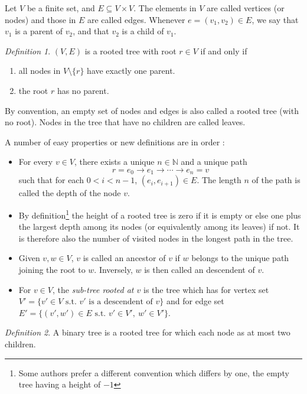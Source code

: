 \documentclass[12pt]{article}
\theoremstyle{plain}
\theoremstyle{remark}
\newtheorem*{definition}{Definition}
\newcommand{\N}{\mathbb{N}}
\begin{document}
Let $V$ be a finite set, and $E \subseteq V \times V.$ The elements in $V$
are called vertices (or nodes) and those in $E$ are called edges. Whenever $e =
(v_1,v_2) \in E$, we say that $v_1$ is a parent of $v_2$, and that $v_2$ is a
child of $v_1$.

\begin{definition} 
$(V,E)$ is a rooted tree with root $r \in V$ if and only if
	\begin{enumerate}
		\item all nodes in $V \setminus \{r\}$ have exactly one parent.
		\item the root $r$ has no parent.
	\end{enumerate}
By convention, an empty set of nodes and edges is also called a rooted tree
(with no root). Nodes in the tree that have no children are called leaves.
\end{definition}

A number of easy properties or new definitions are in order :

\begin{itemize}
	\item
		For every $v \in V$, there exists a unique $n \in \N$ and a
		unique path
		$$
		r = e_0 \to e_1 \to \cdots \to e_n = v 
		$$
		such that for each $0 < i < n-1$, $(e_i,e_{i+1}) \in E$. The
		length $n$ of the path is called the depth of the node $v$. 
	\item
		By definition\footnote{Some authors prefer a different
		convention which differs by one, the empty tree having a height
		of $-1$} the height of a rooted tree is zero if it is empty
		or else one plus the largest depth among its nodes (or
		equivalently among its leaves) if not. It is therefore also the
		number of visited nodes in the longest path in the tree.
	\item   Given $v, w \in V$, $v$ is called an ancestor of $v$ if $w$ belongs to 
		the unique path joining the root to $w$.
		Inversely, $w$ is then called an descendent of $v$.
	\item   For $v \in V$, the {\it sub-tree rooted at $v$} is the tree which has 
		for vertex set $V' = \{
			v' \in V \text{ s.t. } v' \text{ is a descendent of }
			v\}$ and for edge set $E' = \{(v',w') \in E \text{ s.t. }
		v'\in V',\ w' \in V'\}$.
\end{itemize}

\begin{definition} 
A binary tree is a rooted tree for which each node as at most two children.
\end{definition}
\end{document}
